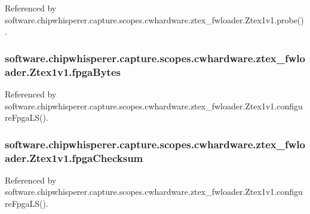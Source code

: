 Referenced by software.\+chipwhisperer.\+capture.\+scopes.\+cwhardware.\+ztex\+\_\+fwloader.\+Ztex1v1.\+probe().

\hypertarget{classsoftware_1_1chipwhisperer_1_1capture_1_1scopes_1_1cwhardware_1_1ztex__fwloader_1_1Ztex1v1_a6ccea214ffc80a11331abab0c2e32f7c}{}
\subsubsection[{fpga\+Bytes}]{\setlength{\rightskip}{0pt plus 5cm}software.\+chipwhisperer.\+capture.\+scopes.\+cwhardware.\+ztex\+\_\+fwloader.\+Ztex1v1.\+fpga\+Bytes}\label{classsoftware_1_1chipwhisperer_1_1capture_1_1scopes_1_1cwhardware_1_1ztex__fwloader_1_1Ztex1v1_a6ccea214ffc80a11331abab0c2e32f7c}


Referenced by software.\+chipwhisperer.\+capture.\+scopes.\+cwhardware.\+ztex\+\_\+fwloader.\+Ztex1v1.\+configure\+Fpga\+L\+S().

\hypertarget{classsoftware_1_1chipwhisperer_1_1capture_1_1scopes_1_1cwhardware_1_1ztex__fwloader_1_1Ztex1v1_a1fdb6576c7ebaa67b2a2089b9ce28230}{}
\subsubsection[{fpga\+Checksum}]{\setlength{\rightskip}{0pt plus 5cm}software.\+chipwhisperer.\+capture.\+scopes.\+cwhardware.\+ztex\+\_\+fwloader.\+Ztex1v1.\+fpga\+Checksum}\label{classsoftware_1_1chipwhisperer_1_1capture_1_1scopes_1_1cwhardware_1_1ztex__fwloader_1_1Ztex1v1_a1fdb6576c7ebaa67b2a2089b9ce28230}


Referenced by software.\+chipwhisperer.\+capture.\+scopes.\+cwhardware.\+ztex\+\_\+fwloader.\+Ztex1v1.\+configure\+Fpga\+L\+S().

